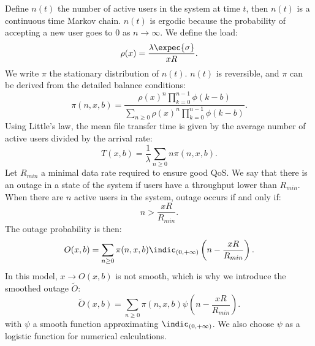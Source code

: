 \documentclass[10pt,conference,letterpaper]{IEEEtran}
\begin{document}
	Define $n(t)$ the number of active users in the system at time $t$, then $n(t)$ is a continuous time Markov chain. $n(t)$ is ergodic because the probability of accepting a new user goes to $0$ as $n \to \infty$. We define the load:
\begin{equation}
	\rho(x) = \frac{\lambda \expec{\sigma} }{x R}.
	\label{eq:load_defintion}
\end{equation}
We write $\pi$ the stationary distribution of $n(t)$. $n(t)$ is reversible, and $\pi$ can be derived from the detailed balance conditions:
\begin{equation}
	\pi(n,x,b) = \frac{ \rho(x)^n \prod_{k=0}^{n-1} \phi(k-b) }{\sum_{n \geq 0}  \rho(x)^n \prod_{k=0}^{n-1} \phi(k-b) }.
	\label{eq:statonary_distribution}
\end{equation}
Using Little's law, the mean file transfer time is given by the average number of active users divided by the arrival rate:
\begin{equation}
	T(x,b) =\frac{1}{\lambda} \sum_{n \geq 0} n\pi(n,x,b).
	\label{eq:file_transfer}
\end{equation}
Let $R_{min}$ a minimal data rate required to ensure good \ac{QoS}. We say that there is an outage in a state of the system if users have a throughput lower than $R_{min}$. When there are $n$ active users in the system, outage occurs if and only if:
\begin{equation}
	n > \frac{xR}{R_{min}}.
	\label{eq:outage_cond}
\end{equation}
The outage probability is then:
\begin{equation}
	O(x,b) = \sum_{n \geq 0} \pi(n,x,b) \indic_{ (0,+\infty) }\left(n - \frac{xR}{R_{min}}  \right).
	\label{eq:outage}
\end{equation}
In this model, $x \to O(x,b)$ is not smooth, which is why we introduce the smoothed outage $\tilde{O}$: 
\begin{equation}
	\tilde{O}(x,b) = \sum_{n \geq 0} \pi(n,x,b)  \psi \left(n - \frac{xR}{R_{min}}\right).
	\label{eq:outage_smooth}
\end{equation}
with $\psi$ a smooth function approximating  $\indic_{(0,+\infty)}$. We also choose $\psi$ as a logistic function for numerical calculations.
\end{document}
